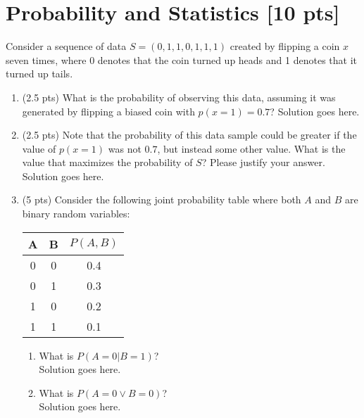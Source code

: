 \documentclass[a4paper]{article}
\theoremstyle{definition}
\newenvironment{soln}{
    \leavevmode\color{blue}\ignorespaces
}{}
\begin{document}
\section{Probability and Statistics [10 pts]}
Consider a sequence of data $S = (0, 1, 1, 0, 1, 1, 1)$ created by flipping a coin $x$ seven times, where 0 denotes that the coin turned up heads and 1 denotes that it turned up tails.
\begin{enumerate}
	\item 	(2.5 pts) What is the probability of observing this data, assuming it was generated by flipping a biased coin with $p(x=1) = 0.7$?
	    \begin{soln}  Solution goes here. \end{soln}
	\item 	(2.5 pts) Note that the probability of this data sample could be greater if the value of $p(x = 1)$ was not $0.7$, but instead some other value. What is the value that maximizes the probability of $S$? Please justify your answer.\\
	    \begin{soln}  Solution goes here. \end{soln}
	\item 	(5 pts) Consider the following joint probability table where both $A$ and $B$ are binary random variables: 
\begin{table}[htb]
\centering
	\begin{tabular}{ccc}\hline
	A & B & $P(A, B)$  \\\hline
	0 & 0 & 0.4 \\
	0 & 1 & 0.3 \\
	1 & 0 & 0.2 \\
	1 & 1 & 0.1 \\\hline
	\end{tabular}
\end{table}
\begin{enumerate}
	\item 	What is $P(A = 0 | B = 1)$?\\
	    \begin{soln}  Solution goes here. \end{soln}
	\item 	What is $P(A = 0 \vee B = 0 )$?\\
	    \begin{soln}  Solution goes here. \end{soln}
\end{enumerate}
\end{enumerate}
\end{document}

